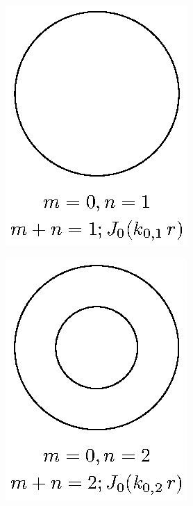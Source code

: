 \begin{minipage}{0.3\textwidth}
\begin{figure}[H]
    \centering
    \includegraphics[scale=1]{Imagenes/Modos_Vibracion_Membrana_0_1.eps}
\end{figure}
\end{minipage}
\begin{minipage}{0.3\textwidth}
\begin{figure}[H]
    \centering
    \includegraphics[scale=1]{Imagenes/Modos_Vibracion_Membrana_0_2.eps}
\end{figure}
\end{minipage}
